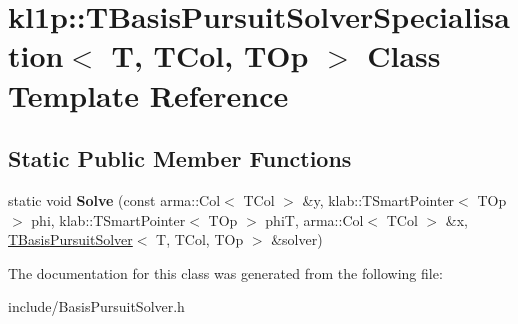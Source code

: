 \hypertarget{classkl1p_1_1TBasisPursuitSolverSpecialisation}{}\section{kl1p\+:\+:T\+Basis\+Pursuit\+Solver\+Specialisation$<$ T, T\+Col, T\+Op $>$ Class Template Reference}
\label{classkl1p_1_1TBasisPursuitSolverSpecialisation}
\subsection*{Static Public Member Functions}
\begin{DoxyCompactItemize}
\item 
static void {\bfseries Solve} (const arma\+::\+Col$<$ T\+Col $>$ \&y, klab\+::\+T\+Smart\+Pointer$<$ T\+Op $>$ phi, klab\+::\+T\+Smart\+Pointer$<$ T\+Op $>$ phiT, arma\+::\+Col$<$ T\+Col $>$ \&x, \hyperlink{classkl1p_1_1TBasisPursuitSolver}{T\+Basis\+Pursuit\+Solver}$<$ T, T\+Col, T\+Op $>$ \&solver)\hypertarget{classkl1p_1_1TBasisPursuitSolverSpecialisation_a613b9b642f603608c7c9a199f5b9d0a4}{}\label{classkl1p_1_1TBasisPursuitSolverSpecialisation_a613b9b642f603608c7c9a199f5b9d0a4}

\end{DoxyCompactItemize}


The documentation for this class was generated from the following file\+:\begin{DoxyCompactItemize}
\item 
include/Basis\+Pursuit\+Solver.\+h\end{DoxyCompactItemize}
